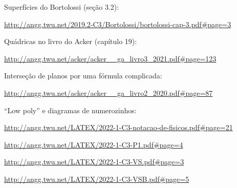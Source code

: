 \documentclass[oneside,12pt]{article}
\begin{document}
\ssk

Superfícies do Bortolossi (seção 3.2):


{\scriptsize

\url{http://angg.twu.net/2019.2-C3/Bortolossi/bortolossi-cap-3.pdf\#page=3}

}

\ssk

Quádricas no livro do Acker (capítulo 19):


{\scriptsize

\url{http://angg.twu.net/acker/acker__ga_livro3_2021.pdf\#page=123}

}

\ssk

Interseção de planos por uma fórmula complicada:

{\scriptsize

\url{http://angg.twu.net/acker/acker__ga_livro2_2020.pdf\#page=87}

}


\ssk

``Low poly'' e diagramas de numerozinhos:


{\scriptsize

\url{http://angg.twu.net/LATEX/2022-1-C3-notacao-de-fisicos.pdf\#page=21}

\url{http://angg.twu.net/LATEX/2022-1-C3-P1.pdf\#page=4}

\url{http://angg.twu.net/LATEX/2022-1-C3-VS.pdf\#page=3}

\url{http://angg.twu.net/LATEX/2022-1-C3-VSB.pdf\#page=5}

}
\end{document}
